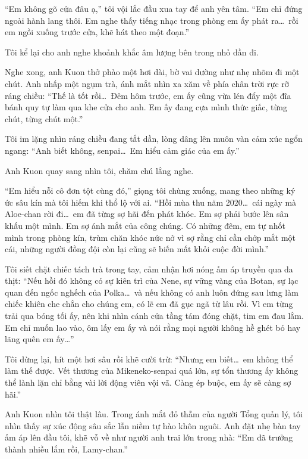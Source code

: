 \documentclass[../main.tex]{subfiles}
\begin{document}
``Em không gõ cửa đâu ạ,'' tôi vội lắc đầu xua tay để anh yên tâm. ``Em chỉ đứng ngoài hành lang thôi. Em nghe thấy tiếng nhạc trong phòng em ấy phát ra\dots\ rồi em ngồi xuống trước cửa, khẽ hát theo một đoạn.''

Tôi kể lại cho anh nghe khoảnh khắc âm lượng bên trong nhỏ dần đi.

Nghe xong, anh Kuon thở phào một hơi dài, bờ vai dường như nhẹ nhõm đi một chút. Anh nhấp một ngụm trà, ánh mắt nhìn xa xăm về phía chân trời rực rỡ ráng chiều: ``Thế là tốt rồi\dots\ Đêm hôm trước, em ấy cũng vừa lén đẩy một đĩa bánh quy tự làm qua khe cửa cho anh. Em ấy đang cựa mình thức giấc, từng chút, từng chút một.''

Tôi im lặng nhìn ráng chiều đang tắt dần, lòng dâng lên muôn vàn cảm xúc ngổn ngang: ``Anh biết không, senpai\dots\ Em hiểu cảm giác của em ấy.''

Anh Kuon quay sang nhìn tôi, chăm chú lắng nghe.

``Em hiểu nỗi cô đơn tột cùng đó,'' giọng tôi chùng xuống, mang theo những ký ức sâu kín mà tôi hiếm khi thổ lộ với ai. ``Hồi mùa thu năm 2020\dots\ cái ngày mà Aloe-chan rời đi\dots\ em đã từng sợ hãi đến phát khóc. Em sợ phải bước lên sân khấu một mình. Em sợ ánh mắt của công chúng. Có những đêm, em tự nhốt mình trong phòng kín, trùm chăn khóc nức nở vì sợ rằng chỉ cần chớp mắt một cái, những người đồng đội còn lại cũng sẽ biến mất khỏi cuộc đời mình.''

Tôi siết chặt chiếc tách trà trong tay, cảm nhận hơi nóng ấm áp truyền qua da thịt: ``Nếu hồi đó không có sự kiên trì của Nene, sự vững vàng của Botan, sự lạc quan đến ngốc nghếch của Polka\dots\ và nếu không có anh luôn đứng sau lưng làm chiếc khiên che chắn cho chúng em, có lẽ em đã gục ngã từ lâu rồi. Vì em từng trải qua bóng tối ấy, nên khi nhìn cánh cửa tầng tám đóng chặt, tim em đau lắm. Em chỉ muốn lao vào, ôm lấy em ấy và nói rằng mọi người không hề ghét bỏ hay lãng quên em ấy\dots''

Tôi dừng lại, hít một hơi sâu rồi khẽ cười trừ: ``Nhưng em biết\dots\ em không thể làm thế được. Vết thương của Mikeneko-senpai quá lớn, sự tổn thương ấy không thể lành lặn chỉ bằng vài lời động viên vội vã. Càng ép buộc, em ấy sẽ càng sợ hãi.''

Anh Kuon nhìn tôi thật lâu. Trong ánh mắt đỏ thẫm của người Tổng quản lý, tôi nhìn thấy sự xúc động sâu sắc lẫn niềm tự hào khôn nguôi. Anh đặt nhẹ bàn tay ấm áp lên đầu tôi, khẽ vỗ về như người anh trai lớn trong nhà: ``Em đã trưởng thành nhiều lắm rồi, Lamy-chan.''
\end{document}
